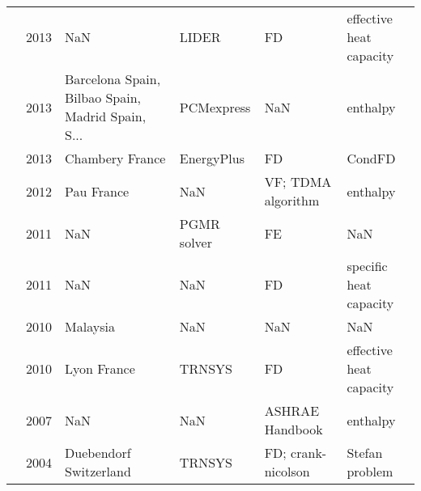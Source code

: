 \begin{tabular}{llllll}
         \cite{Alvarez2013} & 2013 &                                                NaN &                           LIDER &                            FD &                effective heat capacity \\
\cite{Rodriguez-Ubinas2013} & 2013 &  Barcelona Spain, Bilbao Spain, Madrid Spain, S... &                      PCMexpress &                           NaN &                               enthalpy \\
           \cite{Evola2013} & 2013 &                                    Chambery France &                      EnergyPlus &                            FD &                                 CondFD \\
        \cite{Kousksou2012} & 2012 &                                         Pau France &                             NaN &            VF; TDMA algorithm &                               enthalpy \\
        \cite{Alawadhi2011} & 2011 &                                                NaN &                     PGMR solver &                            FE &                                    NaN \\
          \cite{Yahaya2011} & 2011 &                                                NaN &                             NaN &                            FD &                 specific heat capacity \\
         \cite{Hafizal2010} & 2010 &                                           Malaysia &                             NaN &                           NaN &                                    NaN \\
          \cite{Kuznik2010} & 2010 &                                        Lyon France &                          TRNSYS &                            FD &                effective heat capacity \\
            \cite{Zhou2007} & 2007 &                                                NaN &                             NaN &               ASHRAE Handbook &                               enthalpy \\
        \cite{Koschenz2004} & 2004 &                             Duebendorf Switzerland &                          TRNSYS &            FD; crank-nicolson &                         Stefan problem \\
\bottomrule
\end{tabular}
